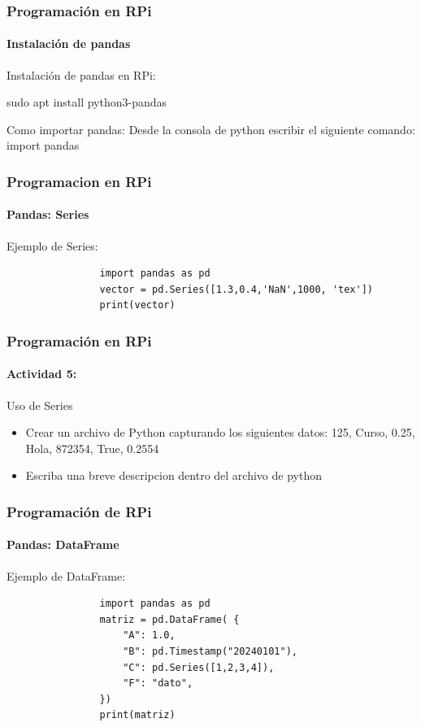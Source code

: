 \documentclass{beamer}
\begin{document}
	\begin{frame}[fragile]
		\frametitle{Programación en RPi}
		\framesubtitle{Instalación de pandas}
		\begin{mybox}{Instalación de pandas en RPi:}
			
				sudo apt install python3-pandas
			
		\end{mybox}
		\begin{mybox}{Como importar pandas:}
			Desde la consola de python escribir el siguiente comando:
			\newline
			import pandas
			
		\end{mybox}
	\end{frame}
	
	\begin{frame}[fragile]
		\frametitle{Programacion en RPi}
		\framesubtitle{Pandas: Series}
		\begin{mybox}{Ejemplo de Series:}
			\begin{lstlisting}
				import pandas as pd
				vector = pd.Series([1.3,0.4,'NaN',1000, 'tex'])
				print(vector)
			\end{lstlisting}
		\end{mybox}
	\end{frame}
	\begin{frame}
		\frametitle{Programación en RPi}
		\framesubtitle{Actividad 5:}
		\begin{mybox}{Uso de Series}
			\begin{itemize}
				\item Crear un archivo de Python capturando los siguientes datos: 125, Curso, 0.25, Hola, 872354, True, 0.2554
				\item Escriba una breve descripcion dentro del archivo de python
			\end{itemize}
		\end{mybox}
	\end{frame}
	\begin{frame}[fragile]
		\frametitle{Programación de RPi}
		\framesubtitle{Pandas: DataFrame}
		\begin{mybox}{Ejemplo de DataFrame:}
			\begin{lstlisting}
				import pandas as pd
				matriz = pd.DataFrame( {
					"A": 1.0,
					"B": pd.Timestamp("20240101"),
					"C": pd.Series([1,2,3,4]),
					"F": "dato",
				})
				print(matriz)
			\end{lstlisting}
		\end{mybox}
	\end{frame}
\end{document}
